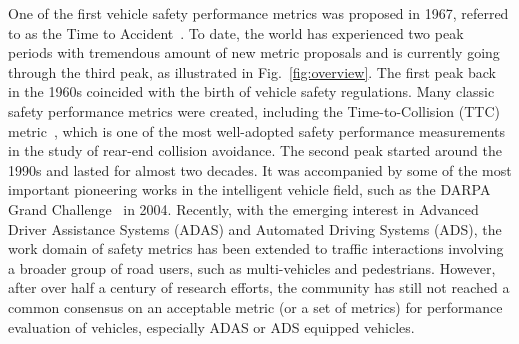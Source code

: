 \documentclass[journal]{IEEEtran}
\begin{document}
One of the first vehicle safety performance metrics was proposed in 1967, referred to as the Time to Accident~\cite{perkins1967traffic}. To date, the world has experienced two peak periods with tremendous amount of new metric proposals and is currently going through the third peak, as illustrated in Fig.~\ref{fig:overview}. The first peak back in the 1960s coincided with the birth of vehicle safety regulations. Many classic safety performance metrics were created, including the Time-to-Collision (TTC) metric~\cite{hayward1972near}, which is one of the most well-adopted safety performance measurements in the study of rear-end collision avoidance. The second peak started around the 1990s and lasted for almost two decades. It was accompanied by some of the most important pioneering works in the intelligent vehicle field, such as the DARPA Grand Challenge~\cite{seetharaman2006unmanned} in 2004. Recently, with the emerging interest in Advanced Driver Assistance Systems (ADAS) and Automated Driving Systems (ADS), the work domain of safety metrics has been extended to traffic interactions involving a broader group of road users, such as multi-vehicles and pedestrians. However, after over half a century of research efforts, the community has still not reached a common consensus on an acceptable metric (or a set of metrics) for performance evaluation of vehicles, especially ADAS or ADS equipped vehicles.
\end{document}
